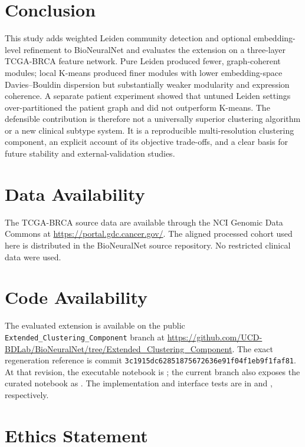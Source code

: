\documentclass[11pt]{article}
\begin{document}
\section{Conclusion}

This study adds weighted Leiden community detection and optional embedding-level refinement to BioNeuralNet and evaluates the extension on a three-layer TCGA-BRCA feature network. Pure Leiden produced fewer, graph-coherent modules; local K-means produced finer modules with lower embedding-space Davies--Bouldin dispersion but substantially weaker modularity and expression coherence. A separate patient experiment showed that untuned Leiden settings over-partitioned the patient graph and did not outperform K-means. The defensible contribution is therefore not a universally superior clustering algorithm or a new clinical subtype system. It is a reproducible multi-resolution clustering component, an explicit account of its objective trade-offs, and a clear basis for future stability and external-validation studies.

\section*{Data Availability}

The TCGA-BRCA source data are available through the NCI Genomic Data Commons at \url{https://portal.gdc.cancer.gov/}. The aligned processed cohort used here is distributed in the BioNeuralNet source repository. No restricted clinical data were used.

\section*{Code Availability}

The evaluated extension is available on the public \texttt{Extended\_Clustering\_Component} branch at \url{https://github.com/UCD-BDLab/BioNeuralNet/tree/Extended_Clustering_Component}. The exact regeneration reference is commit \texttt{3c1915dc62851875672636e91f04f1eb9f1faf81}. At that revision, the executable notebook is ; the current branch also exposes the curated notebook as . The implementation and interface tests are in  and , respectively.

\section*{Ethics Statement}
\end{document}
